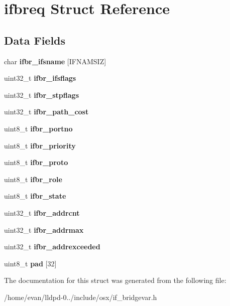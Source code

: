 \section{ifbreq \-Struct \-Reference}
\label{structifbreq}
\subsection*{\-Data \-Fields}
\begin{DoxyCompactItemize}
\item 
char {\bfseries ifbr\-\_\-ifsname} [\-I\-F\-N\-A\-M\-S\-I\-Z]\label{structifbreq_a048abacd801d48d56ce637f4c2edd7cf}

\item 
uint32\-\_\-t {\bfseries ifbr\-\_\-ifsflags}\label{structifbreq_a21cd2d1b667f78b329327fcc44314d0b}

\item 
uint32\-\_\-t {\bfseries ifbr\-\_\-stpflags}\label{structifbreq_aa3439ef9dc815326ef3c82746ac634ba}

\item 
uint32\-\_\-t {\bfseries ifbr\-\_\-path\-\_\-cost}\label{structifbreq_af857fc486c93bb7202cc0bb13e3fc2ca}

\item 
uint8\-\_\-t {\bfseries ifbr\-\_\-portno}\label{structifbreq_afa56166f14af97650120e169e0663504}

\item 
uint8\-\_\-t {\bfseries ifbr\-\_\-priority}\label{structifbreq_ab8985b8ec01d413ce336d2255dab6612}

\item 
uint8\-\_\-t {\bfseries ifbr\-\_\-proto}\label{structifbreq_a9eb053661174cde52c6829f13227e01d}

\item 
uint8\-\_\-t {\bfseries ifbr\-\_\-role}\label{structifbreq_a390e4aab5dbcd7a8c80fe2b9cd2b3381}

\item 
uint8\-\_\-t {\bfseries ifbr\-\_\-state}\label{structifbreq_a9fd44392fd722b751894718cb2559f4c}

\item 
uint32\-\_\-t {\bfseries ifbr\-\_\-addrcnt}\label{structifbreq_a1cec81fa2cc88b866cf2263f86918672}

\item 
uint32\-\_\-t {\bfseries ifbr\-\_\-addrmax}\label{structifbreq_a0ad3d483d252a3083243db3d455184d8}

\item 
uint32\-\_\-t {\bfseries ifbr\-\_\-addrexceeded}\label{structifbreq_a62dc350c599e670aabf8feb42316df07}

\item 
uint8\-\_\-t {\bfseries pad} [32]\label{structifbreq_affb32e08ee34ad86b323a5467e3dffb4}

\end{DoxyCompactItemize}


\-The documentation for this struct was generated from the following file\-:\begin{DoxyCompactItemize}
\item 
/home/evan/lldpd-\/0../include/osx/if\-\_\-bridgevar.\-h\end{DoxyCompactItemize}
